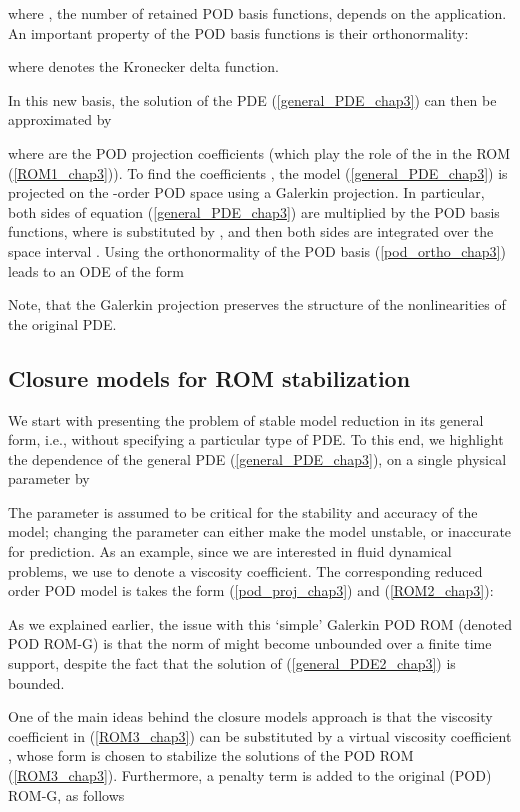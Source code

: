 \documentclass[letterpaper,conference,onecolumn,11pt]{IEEEtran}
\begin{document}
where , the number of retained POD basis
functions, depends on the application. An important property of the
POD basis functions is their orthonormality:

where  denotes the Kronecker delta function.

In this new basis, the solution of the PDE (\ref{general_PDE_chap3})
can then be approximated by

where  are the POD projection
coefficients (which play the role of the  in the ROM
(\ref{ROM1_chap3})).
To find the coefficients , the model (\ref{general_PDE_chap3}) is
projected on the -order POD space using a Galerkin
projection. In particular, both sides of equation (\ref{general_PDE_chap3})
are multiplied by the POD basis functions, where  is
substituted by , and then both sides are integrated over
the space interval . Using the orthonormality
of the POD basis (\ref{pod_ortho_chap3}) leads to an ODE of the form

Note, that the Galerkin projection preserves the structure of the nonlinearities of the original PDE.

\subsection{Closure models for ROM stabilization}\label{closure_models_Chap3}  We start with presenting the problem of stable model reduction in its general form, i.e., without specifying a
particular type of PDE. To this end, we highlight the dependence
of the general PDE  (\ref{general_PDE_chap3}), on a single
physical parameter  by

The parameter  is assumed to be critical for the stability and
accuracy of the model; changing the parameter can either make the
model unstable, or inaccurate for prediction. As an example, since we
are interested in fluid dynamical problems, we use  to denote a
viscosity coefficient. The corresponding reduced order POD model is
takes the form (\ref{pod_proj_chap3}) and (\ref{ROM2_chap3}):

As we explained earlier, the issue with this `simple' Galerkin POD ROM
(denoted POD ROM-G) is that the norm of  might become
unbounded over a finite time support, despite the fact that the
solution of (\ref{general_PDE2_chap3}) is bounded.

One of the main ideas behind the closure models approach is that the
viscosity coefficient  in (\ref{ROM3_chap3}) can be substituted
by a virtual viscosity coefficient , whose form is chosen to
stabilize the solutions of the POD ROM
(\ref{ROM3_chap3}). Furthermore, a penalty term  is
added to the original (POD) ROM-G, as follows
\end{document}
